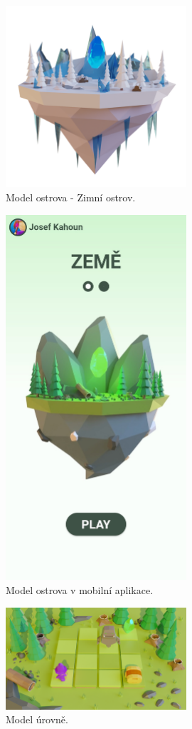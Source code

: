 \begin{figure}[h]
    \centering
    \includegraphics[width=0.6\textwidth]{img/WinterIsland.png}
    \caption{Model ostrova - Zimní ostrov.}
    \label{fig:winter-island}
\end{figure}

\begin{figure}[h]
    \centering
    \includegraphics[width=0.6\textwidth]{img/mobilni-aplikace-ostrov.jpg}
    \caption{Model ostrova v mobilní aplikace.}
    \label{fig:mobilni-aplikace-ostrov}
\end{figure}

\begin{figure}[h]
    \centering
    \includegraphics[width=0.6\textwidth]{img/model-levelu.png}
    \caption{Model úrovně.}
    \label{fig:model-levelu}
\end{figure}